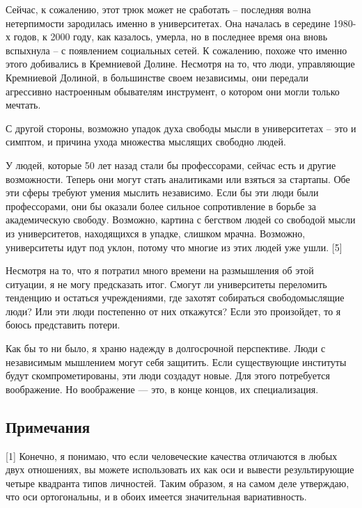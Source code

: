 \documentclass[ebook,12pt,oneside,openany]{memoir}
\begin{document}
Сейчас, к сожалению, этот трюк может не сработать – последняя волна
нетерпимости зародилась именно в университетах. Она началась в
середине 1980-х годов, к 2000 году, как казалось, умерла, но в
последнее время она вновь вспыхнула – с появлением социальных сетей. К
сожалению, похоже что именно этого добивались в Кремниевой Долине.
Несмотря на то, что люди, управляющие Кремниевой Долиной, в
большинстве своем независимы, они передали агрессивно настроенным
обывателям инструмент, о котором они могли только мечтать. \newline

С другой стороны, возможно упадок духа свободы мысли в университетах –
это и симптом, и причина ухода множества мыслящих свободно людей. \newline

У людей, которые 50 лет назад стали бы профессорами, сейчас есть и
другие возможности. Теперь они могут стать аналитиками или взяться за
стартапы. Обе эти сферы требуют умения мыслить независимо. Если бы эти
люди были профессорами, они бы оказали более сильное сопротивление в
борьбе за академическую свободу. Возможно, картина с бегством людей со
свободой мысли из университетов, находящихся в упадке, слишком мрачна.
Возможно, университеты идут под уклон, потому что многие из этих людей
уже ушли. [5] \newline

Несмотря на то, что я потратил много времени на размышления об этой
ситуации, я не могу предсказать итог. Смогут ли университеты
переломить тенденцию и остаться учреждениями, где захотят собираться
свободомыслящие люди? Или эти люди постепенно от них откажутся? Если
это произойдет, то я боюсь представить потери. \newline

Как бы то ни было, я храню надежду в долгосрочной перспективе. Люди с
независимым мышлением могут себя защитить. Если существующие институты
будут скомпрометированы, эти люди создадут новые. Для этого
потребуется воображение. Но воображение — это, в конце концов, их
специализация. \newline

\subsection{Примечания}

[1] Конечно, я понимаю, что если человеческие качества отличаются в
любых двух отношениях, вы можете использовать их как оси и вывести
результирующие четыре квадранта типов личностей. Таким образом, я на
самом деле утверждаю, что оси ортогональны, и в обоих имеется
значительная вариативность. \newline
\end{document}
